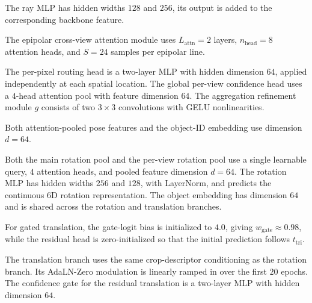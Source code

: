 The ray MLP has hidden widths \(128\) and \(256\), its output is added
to the corresponding backbone feature.

The epipolar cross-view attention module uses \(L_{\mathrm{attn}}=2\) layers, \(n_{\mathrm{head}}=8\) attention heads, and \(S=24\) samples per epipolar line.

The per-pixel routing head is a
two-layer MLP with hidden dimension \(64\), applied independently at each
spatial location. The global per-view confidence head uses a \(4\)-head
attention pool with feature dimension \(64\). The aggregation refinement
module \(g\) consists of two \(3\times3\) convolutions with GELU
nonlinearities.

Both attention-pooled pose features and the object-ID embedding use dimension \(d=64\).

Both the main rotation pool and the per-view rotation pool use a single
learnable query, \(4\) attention heads, and pooled feature dimension
\(d=64\). The rotation MLP has hidden widths \(256\) and \(128\), with
LayerNorm, and predicts the continuous 6D rotation representation. The
object embedding has dimension \(64\) and is shared across the rotation and
translation branches.

For gated translation, the gate-logit bias is initialized to \(4.0\), giving \(w_{\mathrm{gate}}\approx0.98\), while the residual head is zero-initialized so that the initial prediction follows \(t_{\mathrm{tri}}\).

The translation branch uses the same crop-descriptor conditioning as the
rotation branch. Its AdaLN-Zero modulation is linearly ramped in over the
first \(20\) epochs. The confidence gate for the residual translation is a
two-layer MLP with hidden dimension \(64\).


